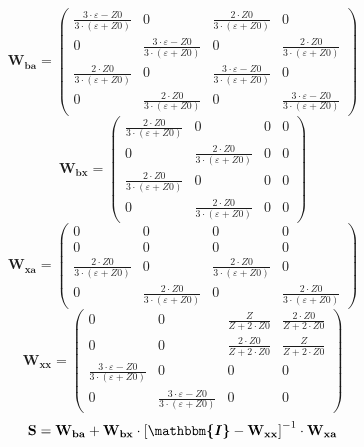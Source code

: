 \[ \mathbf{W_{ba}} = \left(\begin{array}{cccc} \frac{3\cdot
\varepsilon-Z0}{3\cdot \left(\varepsilon+Z0\right)} & 0 & \frac{2\cdot
Z0}{3\cdot \left(\varepsilon+Z0\right)} & 0 \\ 0 & \frac{3\cdot
\varepsilon-Z0}{3\cdot \left(\varepsilon+Z0\right)} & 0 & \frac{2\cdot
Z0}{3\cdot \left(\varepsilon+Z0\right)} \\ \frac{2\cdot Z0}{3\cdot
\left(\varepsilon+Z0\right)} & 0 & \frac{3\cdot \varepsilon-Z0}{3\cdot
\left(\varepsilon+Z0\right)} & 0 \\ 0 & \frac{2\cdot Z0}{3\cdot
\left(\varepsilon+Z0\right)} & 0 & \frac{3\cdot \varepsilon-Z0}{3\cdot
\left(\varepsilon+Z0\right)} \end{array}\right) \]
\[ \mathbf{W_{bx}} = \left(\begin{array}{cccc} \frac{2\cdot Z0}{3\cdot
\left(\varepsilon+Z0\right)} & 0 & 0 & 0 \\ 0 & \frac{2\cdot
Z0}{3\cdot \left(\varepsilon+Z0\right)} & 0 & 0 \\ \frac{2\cdot
Z0}{3\cdot \left(\varepsilon+Z0\right)} & 0 & 0 & 0 \\ 0 &
\frac{2\cdot Z0}{3\cdot \left(\varepsilon+Z0\right)} & 0 & 0
\end{array}\right) \]
\[ \mathbf{W_{xa}} = \left(\begin{array}{cccc} 0 & 0 & 0 & 0 \\ 0 & 0
& 0 & 0 \\ \frac{2\cdot Z0}{3\cdot \left(\varepsilon+Z0\right)} & 0 &
\frac{2\cdot Z0}{3\cdot \left(\varepsilon+Z0\right)} & 0 \\ 0 &
\frac{2\cdot Z0}{3\cdot \left(\varepsilon+Z0\right)} & 0 &
\frac{2\cdot Z0}{3\cdot \left(\varepsilon+Z0\right)}
\end{array}\right) \]
\[ \mathbf{W_{xx}} = \left(\begin{array}{cccc} 0 & 0 &
\frac{Z}{Z+2\cdot Z0} & \frac{2\cdot Z0}{Z+2\cdot Z0} \\ 0 & 0 &
\frac{2\cdot Z0}{Z+2\cdot Z0} & \frac{Z}{Z+2\cdot Z0} \\ \frac{3\cdot
\varepsilon-Z0}{3\cdot \left(\varepsilon+Z0\right)} & 0 & 0 & 0 \\ 0 &
\frac{3\cdot \varepsilon-Z0}{3\cdot \left(\varepsilon+Z0\right)} & 0 &
0 \end{array}\right) \]
\[ \mathbf{S}=\mathbf{W_{ba}}+\mathbf{W_{bx}}\cdot\left[
\boldsymbol{\mathbbm{I}}
-\mathbf{W_{xx}}\right]^{-1}\cdot\mathbf{W_{xa}} \]
